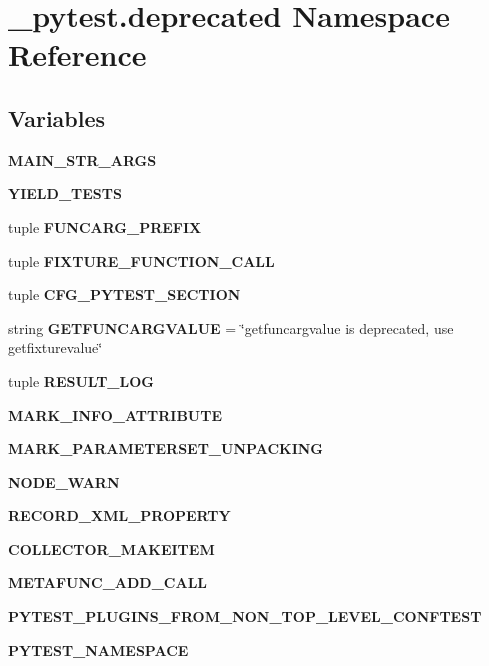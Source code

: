 \hypertarget{namespace__pytest_1_1deprecated}{}\section{\+\_\+pytest.\+deprecated Namespace Reference}
\label{namespace__pytest_1_1deprecated}
\subsection*{Variables}
\begin{DoxyCompactItemize}
\item 
{\bfseries M\+A\+I\+N\+\_\+\+S\+T\+R\+\_\+\+A\+R\+GS}
\item 
{\bfseries Y\+I\+E\+L\+D\+\_\+\+T\+E\+S\+TS}
\item 
tuple {\bfseries F\+U\+N\+C\+A\+R\+G\+\_\+\+P\+R\+E\+F\+IX}
\item 
tuple {\bfseries F\+I\+X\+T\+U\+R\+E\+\_\+\+F\+U\+N\+C\+T\+I\+O\+N\+\_\+\+C\+A\+LL}
\item 
tuple {\bfseries C\+F\+G\+\_\+\+P\+Y\+T\+E\+S\+T\+\_\+\+S\+E\+C\+T\+I\+ON}
\item 
\mbox{\label{namespace__pytest_1_1deprecated_a30e36c1cf257db331569b3db46f80fb7}} 
string {\bfseries G\+E\+T\+F\+U\+N\+C\+A\+R\+G\+V\+A\+L\+UE} = \char`\"{}getfuncargvalue is deprecated, use getfixturevalue\char`\"{}
\item 
tuple {\bfseries R\+E\+S\+U\+L\+T\+\_\+\+L\+OG}
\item 
{\bfseries M\+A\+R\+K\+\_\+\+I\+N\+F\+O\+\_\+\+A\+T\+T\+R\+I\+B\+U\+TE}
\item 
{\bfseries M\+A\+R\+K\+\_\+\+P\+A\+R\+A\+M\+E\+T\+E\+R\+S\+E\+T\+\_\+\+U\+N\+P\+A\+C\+K\+I\+NG}
\item 
{\bfseries N\+O\+D\+E\+\_\+\+W\+A\+RN}
\item 
{\bfseries R\+E\+C\+O\+R\+D\+\_\+\+X\+M\+L\+\_\+\+P\+R\+O\+P\+E\+R\+TY}
\item 
{\bfseries C\+O\+L\+L\+E\+C\+T\+O\+R\+\_\+\+M\+A\+K\+E\+I\+T\+EM}
\item 
{\bfseries M\+E\+T\+A\+F\+U\+N\+C\+\_\+\+A\+D\+D\+\_\+\+C\+A\+LL}
\item 
{\bfseries P\+Y\+T\+E\+S\+T\+\_\+\+P\+L\+U\+G\+I\+N\+S\+\_\+\+F\+R\+O\+M\+\_\+\+N\+O\+N\+\_\+\+T\+O\+P\+\_\+\+L\+E\+V\+E\+L\+\_\+\+C\+O\+N\+F\+T\+E\+ST}
\item 
{\bfseries P\+Y\+T\+E\+S\+T\+\_\+\+N\+A\+M\+E\+S\+P\+A\+CE}
\end{DoxyCompactItemize}


